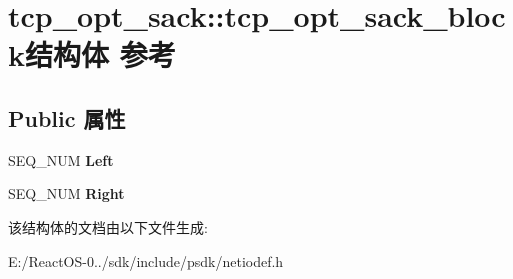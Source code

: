 \hypertarget{structtcp__opt__sack_1_1tcp__opt__sack__block}{}\section{tcp\+\_\+opt\+\_\+sack\+:\+:tcp\+\_\+opt\+\_\+sack\+\_\+block结构体 参考}
\label{structtcp__opt__sack_1_1tcp__opt__sack__block}
\subsection*{Public 属性}
\begin{DoxyCompactItemize}
\item 
\mbox{\label{structtcp__opt__sack_1_1tcp__opt__sack__block_ae80f7033d1a29a37d19386ca0c98e916}} 
S\+E\+Q\+\_\+\+N\+UM {\bfseries Left}
\item 
\mbox{\label{structtcp__opt__sack_1_1tcp__opt__sack__block_aa32b171fa0b5979dfeae031da1f65841}} 
S\+E\+Q\+\_\+\+N\+UM {\bfseries Right}
\end{DoxyCompactItemize}


该结构体的文档由以下文件生成\+:\begin{DoxyCompactItemize}
\item 
E\+:/\+React\+O\+S-\/0../sdk/include/psdk/netiodef.\+h\end{DoxyCompactItemize}

